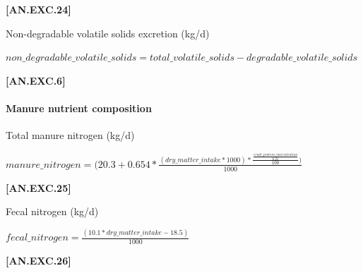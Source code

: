 \documentclass{article}
\begin{document}
\begin{refsection}
\begin{itemize}
\begin{center}
    \end{center}
        \vspace{0.5cm} 
    
            {\raggedleft \textbf{[AN.EXC.24]}\par}
            \vspace{0.5cm}
            
Non-degradable volatile solids excretion (kg/d)
        \vspace{0.5cm}
    
    \begin{center}
        \(non\_degradable\_volatile\_solids = total\_volatile\_solids - degradable\_volatile\_solids\)
    \end{center}
        \vspace{0.5cm} 
    
            {\raggedleft \textbf{[AN.EXC.6]}\par}
            \vspace{0.5cm}

\paragraph{Manure nutrient composition}
\vspace{-0.25cm}

Total manure nitrogen (kg/d)
        \vspace{0.5cm}
    
    \begin{center}
        \(manure\_nitrogen =(20.3
+0.654 * \frac{(dry\_matter\_intake * 1000)* \frac{\frac{crude\_protein\_concentration}{6.25}}{100})}{1000}
\)
    \end{center}
        \vspace{0.5cm} 
    
            {\raggedleft \textbf{[AN.EXC.25]}\par}
            \vspace{0.5cm}

Fecal nitrogen (kg/d) 
        \vspace{0.5cm}
    
    \begin{center}
        \(fecal\_nitrogen=\frac{(10.1 * dry\_matter\_intake - 18.5)}{1000} \)
    \end{center}
        \vspace{0.5cm} 
    
            {\raggedleft \textbf{[AN.EXC.26]}\par}
            \vspace{0.5cm}


\end{itemize}
\end{refsection}
\end{document}
